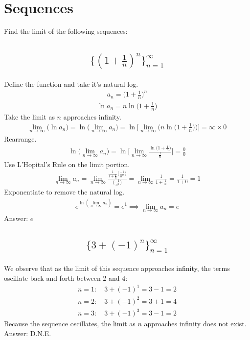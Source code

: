 \documentclass{article}
\begin{document}
\section{Sequences}
Find the limit of the following sequences:
\subsection{
	\begin{align*}
		\biggl\{ \left(1 + \frac{1}{n} \right)^n \biggl\}_{n=1}^\infty
	\end{align*}
}
Define the function and take it's natural log.
\begin{align*}
	a_n = \bigg( 1 + \frac{1}{n} \bigg)^n
\end{align*}
\begin{align*}
	\ln{a_n} = n \ln{\bigg( 1 + \frac{1}{n} \bigg)}
\end{align*}
Take the limit as $n$ approaches infinity.
\begin{align*}
	\lim_{n \to \infty} \bigg( \ln{a_n} \bigg) = \ln \bigg( \lim_{n \to \infty} a_n \bigg) = \ln \bigg[ \lim_{n \to \infty} \bigg( n \ln{\bigg(1 + \frac{1}{n} \bigg)} \bigg) \bigg] = \infty \times 0
\end{align*}
Rearrange.
\begin{align*}
	\ln{\bigg( \lim_{n \to \infty} a_n \bigg)} = \ln{\bigg[ \lim_{n \to \infty} \frac{\ln{\bigg( 1 + \frac{1}{n} \bigg)}}{\frac{1}{n}} \bigg]} = \frac{0}{0}
\end{align*}
Use L'Hopital's Rule on the limit portion.
\begin{align*}
	\lim_{n \to \infty} a_n = \lim_{n \to \infty} \frac{\frac{1}{1 + \frac{1}{n}}\bigg( \frac{-1}{n^2} \bigg)}{\bigg( \frac{-1}{n^2} \bigg)} = \lim_{n \to \infty} \frac{1}{1 + \frac{1}{n}} = \frac{1}{1 + 0} = 1
\end{align*}
Exponentiate to remove the natural log.
\begin{align*}
	e^{\ln{( \lim_{n \to \infty} a_n )}} = e^1 \implies \lim_{n \to \infty} a_n = e
\end{align*}
Answer: $e$

\subsection{
	\begin{align*}
		\bigl\{ 3 + (-1)^n \bigl\}_{n=1}^\infty
	\end{align*}
}
We observe that as the limit of this sequence approaches infinity, the terms oscillate back and forth between 2 and 4:
\begin{align*}
	n = 1: \quad 3 + (-1)^1 = 3 - 1 = 2 \\
	n = 2: \quad 3 + (-1)^2 = 3 + 1 = 4 \\
	n = 3: \quad 3 + (-1)^3 = 3 - 1 = 2
\end{align*}
Because the sequence oscillates, the limit as $n$ approaches infinity does not exist. \\[10pt]
Answer: D.N.E.
\end{document}
